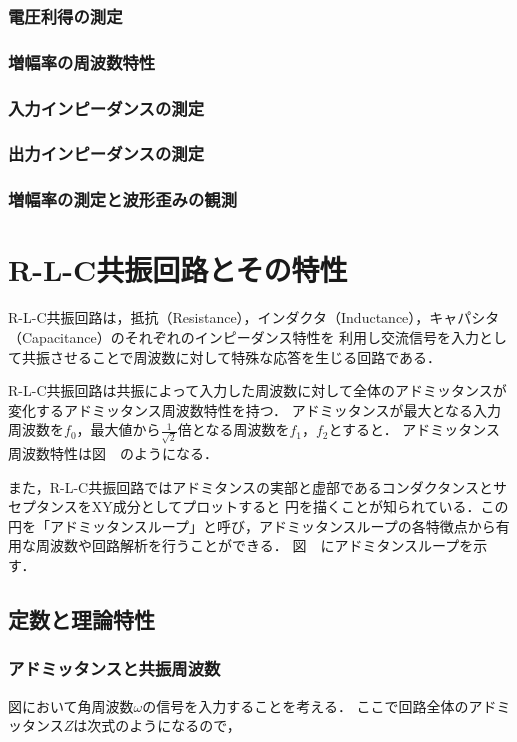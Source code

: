 \documentclass[dvipdfmx,titlepage,a4j]{jsarticle}  %
\begin{document}
\subsubsection{電圧利得の測定}

\subsubsection{増幅率の周波数特性}

\subsubsection{入力インピーダンスの測定}

\subsubsection{出力インピーダンスの測定}

\subsubsection{増幅率の測定と波形歪みの観測}

\section{R-L-C共振回路とその特性}
R-L-C共振回路は，抵抗（Resistance），インダクタ（Inductance），キャパシタ（Capacitance）のそれぞれのインピーダンス特性を
利用し交流信号を入力として共振させることで周波数に対して特殊な応答を生じる回路である．

R-L-C共振回路は共振によって入力した周波数に対して全体のアドミッタンスが変化するアドミッタンス周波数特性を持つ．
アドミッタンスが最大となる入力周波数を$f_0$，最大値から$\frac{1}{\sqrt{2}}$倍となる周波数を$f_1$，$f_2$とすると．
アドミッタンス周波数特性は図　のようになる．

また，R-L-C共振回路ではアドミタンスの実部と虚部であるコンダクタンスとサセプタンスをXY成分としてプロットすると
円を描くことが知られている．この円を「アドミッタンスループ」と呼び，アドミッタンスループの各特徴点から有用な周波数や回路解析を行うことができる．
図　にアドミタンスループを示す．

\subsection{定数と理論特性}

\subsubsection{アドミッタンスと共振周波数}
図において角周波数$\omega$の信号を入力することを考える．
ここで回路全体のアドミッタンス$Z$は次式のようになるので，
\end{document}

